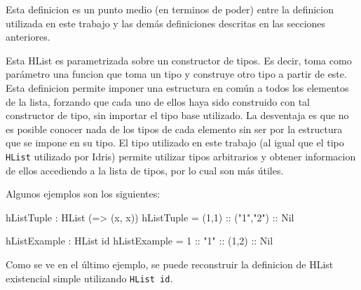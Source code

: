 Esta definicion es un punto medio (en terminos de poder) entre la definicion utilizada en este trabajo y las demás definiciones descritas en las secciones anteriores.

Esta HList es parametrizada sobre un constructor de tipos. Es decir, toma como parámetro una funcion que toma un tipo y construye otro tipo a partir de este. Esta definicion permite imponer una estructura en común a todos los elementos de la lista, forzando que cada uno de ellos haya sido construido con tal constructor de tipo, sin importar el tipo base utilizado.
La desventaja es que no es posible conocer nada de los tipos de cada elemento sin ser por la estructura que se impone en su tipo. El tipo utilizado en este trabajo (al igual que el tipo \texttt{HList} utilizado por Idris) permite utilizar tipos arbitrarios y obtener informacion de ellos accediendo a la lista de tipos, por lo cual son más útiles.

Algunos ejemplos son los siguientes:

\begin{code}
hListTuple : HList (\x => (x, x))
hListTuple = (1,1) :: ("1","2") :: Nil

hListExample : HList id
hListExample = 1 :: "1" :: (1,2) :: Nil
\end{code}

Como se ve en el último ejemplo, se puede reconstruir la definicion de HList existencial simple utilizando \texttt{HList id}.

